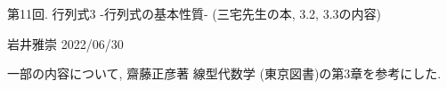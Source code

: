 \documentclass[dvipdfmx,a4paper,11pt]{article}
\theoremstyle{definition}
\begin{document}
\begin{center}
{\Large 第11回. 行列式3 -行列式の基本性質- (三宅先生の本, 3.2, 3.3の内容)} 
\end{center}

\begin{flushright}
 岩井雅崇 2022/06/30
\end{flushright}

一部の内容について, 齋藤正彦著 線型代数学 (東京図書)の第3章を参考にした.

\end{document}
